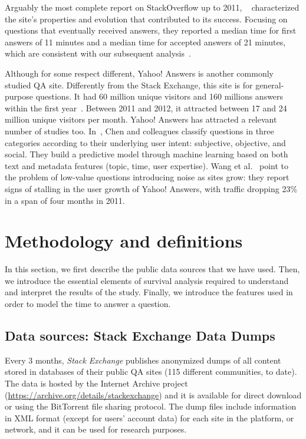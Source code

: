 \documentclass{chi2012}
\begin{document}
Arguably the most complete report on StackOverflow up to 2011, ~\cite{mamykina2011} 
characterized the site’s properties and evolution that contributed to its 
success. Focusing on questions that eventually received answers, they reported a 
median time for first answers of 11 minutes and a median time for accepted answers of 21 
minutes, which are consistent with our subsequent analysis~\cite{piccardi2014}.

Although for some respect different, Yahoo! Answers is another commonly studied QA site. Differently from the Stack Exchange, this site is for general-purpose questions. It had 
60 million unique visitors and 160 millions answers within the first year~\cite{pal2012}.
Between 2011 and 2012, it attracted between 17 and 24 million unique visitors per month.
Yahoo! Answers has attracted a relevant number of studies too. In~\cite{chen2012}, Chen 
and colleagues classify questions in three categories according to their underlying user 
intent: subjective, objective, and social. They build a predictive model through machine
learning based on both text and metadata features (topic, time, user expertise). Wang et
al.~\cite{wang2013} point to the problem of low-value questions introducing noise as 
sites grow: they report signs of stalling in the user growth of Yahoo! Answers, with 
traffic dropping 23\% in a span of four months in 2011. 


\section{Methodology and definitions}

In this section, we first describe the public data sources that we have used. Then, we introduce the essential elements of survival analysis required to
understand and interpret the results of the study. Finally, we introduce the features used in order to model the time to answer a question.

\subsection{Data sources: Stack Exchange Data Dumps}

Every 3 months, \textit{Stack Exchange} publishes anonymized dumps of all content stored in
databases of their public QA sites (115 different communities, to date). The data 
is hosted by the Internet Archive project (\url{https://archive.org/details/stackexchange}) 
and it is available for direct download or using the BitTorrent file sharing protocol. 
The dump files include information in XML format (except for users’ account data) for 
each site in the platform, or network, and it can be used for research purposes. 
\end{document}
